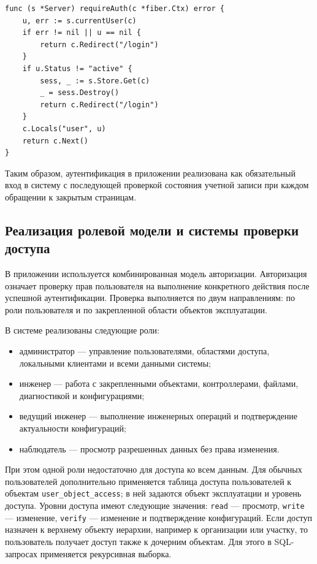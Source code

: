 \begin{samepage}
\begin{lstlisting}[caption={Проверка активной сессии пользователя}, label={lst:chapter3_auth_check}]
func (s *Server) requireAuth(c *fiber.Ctx) error {
    u, err := s.currentUser(c)
    if err != nil || u == nil {
        return c.Redirect("/login")
    }
    if u.Status != "active" {
        sess, _ := s.Store.Get(c)
        _ = sess.Destroy()
        return c.Redirect("/login")
    }
    c.Locals("user", u)
    return c.Next()
}
\end{lstlisting}
\end{samepage}

Таким образом, аутентификация в приложении реализована как обязательный вход в систему с последующей проверкой состояния учетной записи при каждом обращении к закрытым страницам.


\subsection{Реализация ролевой модели и системы проверки доступа}

В приложении используется комбинированная модель авторизации. Авторизация означает проверку прав пользователя на выполнение конкретного действия после успешной аутентификации. Проверка выполняется по двум направлениям: по роли пользователя и по закрепленной области объектов эксплуатации.

В системе реализованы следующие роли:
\begin{itemize}
    \item администратор --- управление пользователями, областями доступа, локальными клиентами и всеми данными системы;
    \item инженер --- работа с закрепленными объектами, контроллерами, файлами, диагностикой и конфигурациями;
    \item ведущий инженер --- выполнение инженерных операций и подтверждение актуальности конфигураций;
    \item наблюдатель --- просмотр разрешенных данных без права изменения.
\end{itemize}

При этом одной роли недостаточно для доступа ко всем данным. Для обычных пользователей дополнительно применяется таблица доступа пользователей к объектам \texttt{user\_object\_access}; в ней задаются объект эксплуатации и уровень доступа. Уровни доступа имеют следующие значения: \texttt{read} --- просмотр, \texttt{write} --- изменение, \texttt{verify} --- изменение и подтверждение конфигураций. Если доступ назначен к верхнему объекту иерархии, например к организации или участку, то пользователь получает доступ также к дочерним объектам. Для этого в SQL-запросах применяется рекурсивная выборка.

